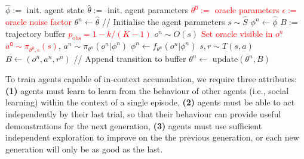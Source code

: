 \documentclass{article}
\begin{document}
\begin{algorithm}
\caption{Training Loop for In-Context Accumulation (changes to RL$^2$ in \textcolor{red}{red})}\label{alg:rl2}
\begin{algorithmic}[1]
\STATE $\hat{\phi} :=$ init. agent state
\STATE $\hat{\theta} :=$ init. agent parameters
\STATE \textcolor{red}{$\theta^\texttt{O} :=$ oracle parameters}
\STATE \textcolor{red}{$\epsilon :=$ oracle noise factor}
\STATE $\theta^n \gets \hat{\theta}$ // Initialise the agent parameters
\STATE $s \sim \hat{S}$
\STATE $\phi^n \leftarrow \hat{\phi}$
\STATE $B :=$ trajectory buffer
\STATE \textcolor{red}{$p_{\text{obs}} = 1 - k/(K-1)$}
\STATE $o^n \sim O(s)$
\STATE \textcolor{red}{Set oracle visible in $o^n$}
\ENDIF
\STATE \textcolor{red}{$a^\texttt{O} \sim \pi_{\theta^\texttt{O}, \epsilon}(s)$}, $a^n \sim \pi_{\theta^n}(o^n | \phi^n)$
\STATE $\phi^n \gets f_{\theta^n}(o^n | \phi^n)$
\STATE $s, r \sim T(s, a)$
\STATE $B \leftarrow (o^n, a^n, r^n)$ // Append transition to buffer
\ENDWHILE
\ENDFOR
\STATE $\theta^n \leftarrow$ update$(\theta^n, B)$
\ENDFOR
\end{algorithmic}
\end{algorithm}

To train agents capable of in-context accumulation, we require three attributes: \textbf{(1)} agents must learn to learn from the behaviour of other agents (i.e., social learning) within the context of a single episode, \textbf{(2)} agents must be able to act independently by their last trial, so that their behaviour can provide useful demonstrations for the next generation, \textbf{(3)} agents must use sufficient independent exploration to improve on the the previous generation, or each new generation will only be as good as the last.
\end{document}
